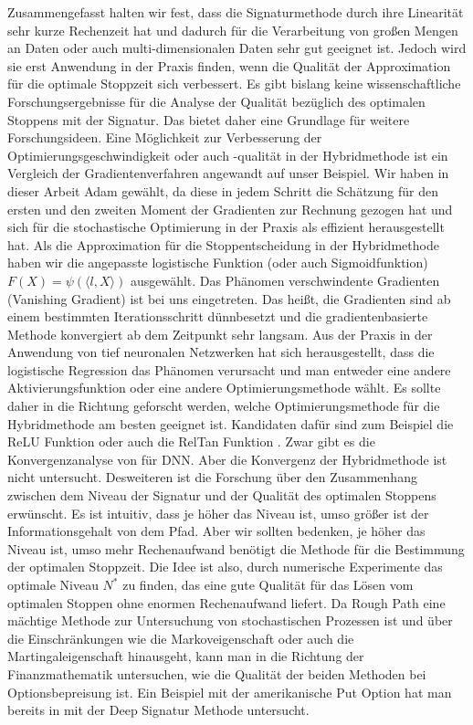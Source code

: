 \documentclass[12pt,titlepage,headsepline]{article}
\begin{document}
        \hfill\break
        Zusammengefasst halten wir fest, dass die Signaturmethode durch ihre Linearität sehr kurze Rechenzeit hat und dadurch für die Verarbeitung von großen Mengen an Daten oder auch multi-dimensionalen Daten sehr gut geeignet ist. Jedoch wird sie erst Anwendung in der Praxis finden, wenn die Qualität der Approximation für die optimale Stoppzeit sich verbessert. Es gibt bislang keine wissenschaftliche Forschungsergebnisse für die Analyse der Qualität bezüglich des optimalen Stoppens mit der Signatur. Das bietet daher eine Grundlage für weitere Forschungsideen.
        \hfill\break
        Eine Möglichkeit zur Verbesserung der Optimierungsgeschwindigkeit oder auch -qualität in der Hybridmethode ist ein Vergleich der Gradientenverfahren angewandt auf unser Beispiel. Wir haben in dieser Arbeit Adam gewählt, da diese in jedem Schritt die Schätzung für den ersten und den zweiten Moment der Gradienten zur Rechnung gezogen hat und sich für die stochastische Optimierung in der Praxis als effizient herausgestellt hat. Als die Approximation für die Stoppentscheidung in der Hybridmethode haben wir die angepasste logistische Funktion (oder auch Sigmoidfunktion) $F(X)=\psi(\langle l, X \rangle)$ ausgewählt. Das Phänomen verschwindente Gradienten (Vanishing Gradient) ist bei uns eingetreten. Das heißt, die Gradienten sind ab einem bestimmten Iterationsschritt dünnbesetzt und die gradientenbasierte Methode konvergiert ab dem Zeitpunkt sehr langsam. Aus der Praxis in der Anwendung von tief neuronalen Netzwerken hat sich herausgestellt, dass die logistische Regression das Phänomen verursacht und man entweder eine andere Aktivierungsfunktion oder eine andere Optimierungsmethode wählt. Es sollte daher in die Richtung geforscht werden, welche Optimierungsmethode für die Hybridmethode am besten geeignet ist. Kandidaten dafür sind zum Beispiel die ReLU Funktion oder auch die RelTan Funktion \cite{wang_reltanh_2019}.
        \hfill\break
        Zwar gibt es die Konvergenzanalyse von \cite{becker_deep_2019} für DNN. Aber die Konvergenz der Hybridmethode ist nicht untersucht. Desweiteren ist die Forschung über den Zusammenhang zwischen dem Niveau der Signatur und der Qualität des optimalen Stoppens erwünscht. Es ist intuitiv, dass je höher das Niveau ist, umso größer ist der Informationsgehalt von dem Pfad. Aber wir sollten bedenken, je höher das Niveau ist, umso mehr Rechenaufwand benötigt die Methode für die Bestimmung der optimalen Stoppzeit. Die Idee ist also, durch numerische Experimente das optimale Niveau $N^*$ zu finden, das eine gute Qualität für das Lösen vom optimalen Stoppen ohne enormen Rechenaufwand liefert.
        \hfill\break
        Da Rough Path eine mächtige Methode zur Untersuchung von stochastischen Prozessen ist und über die Einschränkungen wie die Markoveigenschaft oder auch die Martingaleigenschaft hinausgeht, kann man in die Richtung der Finanzmathematik untersuchen, wie die Qualität der beiden Methoden bei Optionsbepreisung ist. Ein Beispiel mit der amerikanische Put Option hat man bereits in \cite{bayer_optimal_2020} mit der Deep Signatur Methode untersucht.
\end{document}
